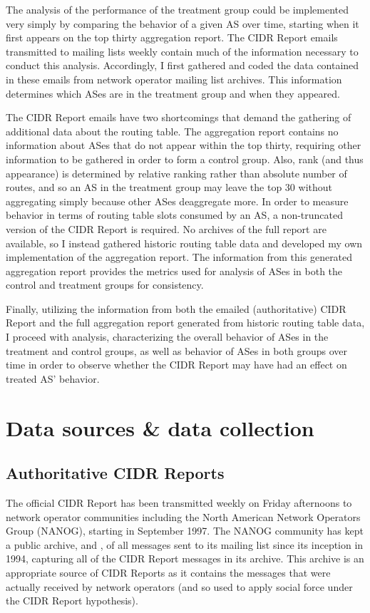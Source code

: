 The analysis of the performance of the treatment group could be implemented very simply by comparing the behavior of a given AS over time, starting when it first appears on the top thirty aggregation report. The CIDR Report emails transmitted to mailing lists weekly contain much of the information necessary to conduct this analysis. Accordingly, I first gathered and coded the data contained in these emails from network operator mailing list archives. This information determines which ASes are in the treatment group and when they appeared.

The CIDR Report emails have two shortcomings that demand the gathering of additional data about the routing table. The aggregation report contains no information about ASes that do not appear within the top thirty, requiring other information to be gathered in order to form a control group. Also, rank (and thus appearance) is determined by relative ranking rather than absolute number of routes, and so an AS in the treatment group may leave the top 30 without aggregating simply because other ASes deaggregate more. In order to measure behavior in terms of routing table slots consumed by an AS, a non-truncated version of the CIDR Report is required. No archives of the full report are available, so I instead gathered historic routing table data and developed my own implementation of the aggregation report. The information from this generated aggregation report provides the metrics used for analysis of ASes in both the control and treatment groups for consistency.

Finally, utilizing the information from both the emailed (authoritative) CIDR Report and the full aggregation report generated from historic routing table data, I proceed with analysis, characterizing the overall behavior of ASes in the treatment and control groups, as well as behavior of ASes in both groups over time in order to observe whether the CIDR Report may have had an effect on treated AS' behavior.

\section{Data sources \& data collection} %

\subsection{Authoritative CIDR Reports}

The official CIDR Report has been transmitted weekly on Friday afternoons to network operator communities including the North American Network Operators Group (NANOG), starting in September 1997. The NANOG community has kept a public archive, \cite{NANOG} and \cite{NANOG-new}, of all messages sent to its mailing list since its inception in 1994, capturing all of the CIDR Report messages in its archive. This archive is an appropriate source of CIDR Reports as it contains the messages that were actually received by network operators (and so used to apply social force under the CIDR Report hypothesis).

